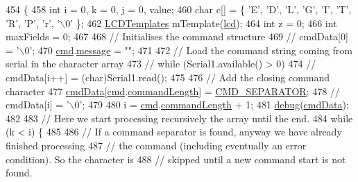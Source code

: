 \begin{DoxyCode}
\begin{DoxyCode}
\begin{DoxyCode}
\begin{DoxyCode}
454               \{
458   \textcolor{keywordtype}{int} i = 0, k = 0, j = 0, value;
460   \textcolor{keywordtype}{char} c[] = \{ \textcolor{charliteral}{'E'}, \textcolor{charliteral}{'D'}, \textcolor{charliteral}{'L'}, \textcolor{charliteral}{'G'}, \textcolor{charliteral}{'I'}, \textcolor{charliteral}{'T'}, \textcolor{charliteral}{'R'}, \textcolor{charliteral}{'P'}, \textcolor{charliteral}{'r'}, \textcolor{charliteral}{'\(\backslash\)0'} \};
462   \hyperlink{class_l_c_d_templates}{LCDTemplates} mTemplate(\hyperlink{_meditech___chip_kit_control_panel_8pde_ae0b100905fb0ed88dddaafda0aa05379}{lcd});
464   \textcolor{keywordtype}{int} z = 0;
466   \textcolor{keywordtype}{int} maxFields = 0;
467   
468   \textcolor{comment}{// Initialises the command structure}
469 \textcolor{comment}{//  cmdData[0] = '\(\backslash\)0';}
470   \hyperlink{_meditech___chip_kit_control_panel_8pde_a9ec7ba7a86dba057afdae246ca1ac40e}{cmd}.\hyperlink{structparse_command_a5d2f84606922f34ad6a8ca5f7d8a59b5}{message} = \textcolor{stringliteral}{""};
471 
472   \textcolor{comment}{// Load the command string coming from serial in the character array}
473 \textcolor{comment}{//  while (Serial1.available() > 0)}
474 \textcolor{comment}{//      cmdData[i++] = (char)Serial1.read();}
475   
476   \textcolor{comment}{// Add the closing command character}
477   \hyperlink{_meditech___chip_kit_control_panel_8pde_afd31a444e0380e6be247c64cdb1510a9}{cmdData}[\hyperlink{_meditech___chip_kit_control_panel_8pde_a9ec7ba7a86dba057afdae246ca1ac40e}{cmd}.\hyperlink{structparse_command_a8359e121af4d2f16e054ead0b7844a30}{commandLength}] = \hyperlink{_command_processor_8h_aa3115116a4036d93c8c91cf7e0f13c70}{CMD\_SEPARATOR};
478 \textcolor{comment}{//  cmdData[i] = '\(\backslash\)0';}
479   
480   i = \hyperlink{_meditech___chip_kit_control_panel_8pde_a9ec7ba7a86dba057afdae246ca1ac40e}{cmd}.\hyperlink{structparse_command_a8359e121af4d2f16e054ead0b7844a30}{commandLength} + 1;
481   \hyperlink{_meditech___chip_kit_control_panel_8pde_ad5b3677e61ca769d9d9e5cf9cfa1b33c}{debug}(\hyperlink{_meditech___chip_kit_control_panel_8pde_afd31a444e0380e6be247c64cdb1510a9}{cmdData});
482   
483   \textcolor{comment}{// Here we start processing recursively the array until the end.}
484   \textcolor{keywordflow}{while} (k < i) \{
485     
486     \textcolor{comment}{// If a command separator is found, anyway we have already finished processing}
487     \textcolor{comment}{// the command (including eventually an error condition). So the character is}
488     \textcolor{comment}{// skipped until a new command start is not found.}

\end{DoxyCode}
\end{DoxyCode}
\end{DoxyCode}
\end{DoxyCode}
